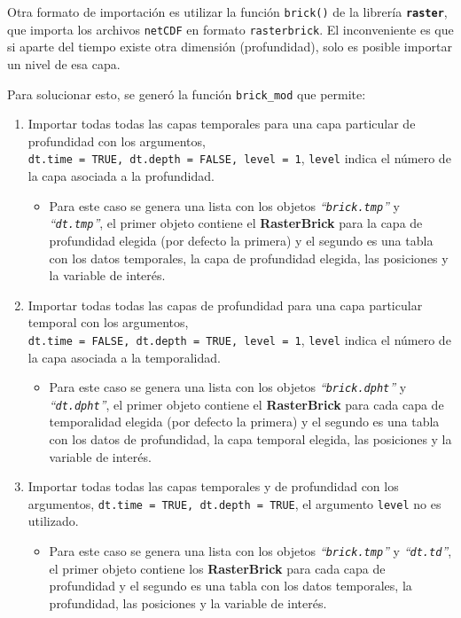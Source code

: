 \documentclass[
]{article}
\providecommand{\tightlist}{%
  \setlength{\itemsep}{0pt}\setlength{\parskip}{0pt}}\usepackage{longtable,booktabs,array}
\begin{document}
Otra formato de importación es utilizar la función \texttt{brick()} de
la librería \textbf{\texttt{raster}}, que importa los archivos
\texttt{netCDF} en formato \texttt{rasterbrick}. El inconveniente es que
si aparte del tiempo existe otra dimensión (profundidad), solo es
posible importar un nivel de esa capa.

Para solucionar esto, se generó la función \texttt{brick\_mod} que
permite:

\begin{enumerate}
\def\labelenumi{\arabic{enumi}.}
\tightlist
\item
  Importar todas todas las capas temporales para una capa particular de
  profundidad con los argumentos,
  \texttt{dt.time\ =\ TRUE,\ dt.depth\ =\ FALSE,\ level\ =\ 1},
  \texttt{level} indica el número de la capa asociada a la profundidad.

  \begin{itemize}
  \tightlist
  \item
    Para este caso se genera una lista con los objetos
    \emph{``\emph{\texttt{brick.tmp}}''} y
    \emph{``\emph{\texttt{dt.tmp}}''}, el primer objeto contiene el
    \textbf{RasterBrick} para la capa de profundidad elegida (por
    defecto la primera) y el segundo es una tabla con los datos
    temporales, la capa de profundidad elegida, las posiciones y la
    variable de interés.
  \end{itemize}
\item
  Importar todas todas las capas de profundidad para una capa particular
  temporal con los argumentos,
  \texttt{dt.time\ =\ FALSE,\ dt.depth\ =\ TRUE,\ level\ =\ 1},
  \texttt{level} indica el número de la capa asociada a la temporalidad.

  \begin{itemize}
  \tightlist
  \item
    Para este caso se genera una lista con los objetos
    \emph{``\emph{\texttt{brick.dpht}}''} y
    \emph{``\emph{\texttt{dt.dpht}}''}, el primer objeto contiene el
    \textbf{RasterBrick} para cada capa de temporalidad elegida (por
    defecto la primera) y el segundo es una tabla con los datos de
    profundidad, la capa temporal elegida, las posiciones y la variable
    de interés.
  \end{itemize}
\item
  Importar todas todas las capas temporales y de profundidad con los
  argumentos, \texttt{dt.time\ =\ TRUE,\ dt.depth\ =\ TRUE}, el
  argumento \texttt{level} no es utilizado.

  \begin{itemize}
  \tightlist
  \item
    Para este caso se genera una lista con los objetos
    \emph{``\emph{\texttt{brick.tmp}}''} y
    \emph{``\emph{\texttt{dt.td}}''}, el primer objeto contiene los
    \textbf{RasterBrick} para cada capa de profundidad y el segundo es
    una tabla con los datos temporales, la profundidad, las posiciones y
    la variable de interés.
  \end{itemize}
\end{enumerate}
\end{document}
